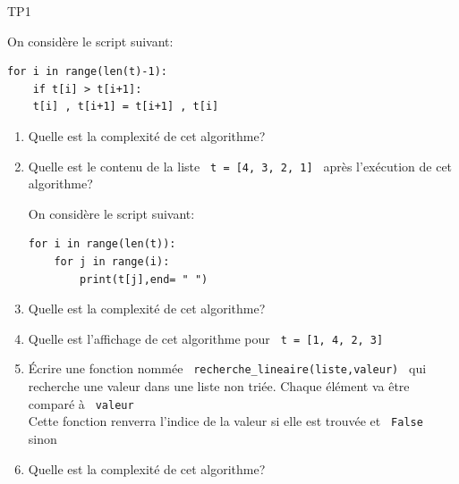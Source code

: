 \documentclass[a4paper,12pt,openany]{book}
\begin{document}
\begin{center}\begin{huge}
TP1
\end{huge}\end{center}

\exo 

On considère le script suivant:

\begin{lstlisting}[numbers = none]
for i in range(len(t)-1):
	if t[i] > t[i+1]:
	t[i] , t[i+1] = t[i+1] , t[i]
\end{lstlisting}

\begin{enumerate}
	\item Quelle est la complexité de cet algorithme?
	
	\item Quelle est le contenu de la liste \verb+ t = [4, 3, 2, 1] + après l'exécution de cet algorithme?

\bigskip

\exo

On considère le script suivant:

\begin{lstlisting}[numbers = none]
for i in range(len(t)):
	for j in range(i):
		print(t[j],end= " ")
\end{lstlisting}

	\item Quelle est la complexité de cet algorithme?
	
	\item Quelle est l'affichage de cet algorithme pour   \verb+ t = [1, 4, 2, 3] +

\bigskip

\exo


\item Écrire une fonction nommée \verb+ recherche_lineaire(liste,valeur) + qui recherche une valeur dans une liste non triée. Chaque élément va être comparé à \verb+ valeur +\\

Cette fonction renverra l'indice de la valeur si elle est trouvée et \verb+ False + sinon

\vspace{5cm}

\item Quelle est la complexité de cet algorithme? \dotfill\\


\end{enumerate}
\end{document}

